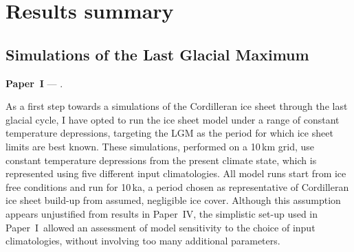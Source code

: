 \documentclass{article}
\newcommand{\todo}[1]{} %
\newcommand{\CCLI}[0]{Paper~I}      %
\newcommand{\CCYC}[0]{Paper~IV}     %
\begin{document}



\section{Results summary}

\subsection{Simulations of the Last Glacial Maximum}

\noindent\textbf{\CCLI} --- .
\bigskip

As a first step towards a simulations of the Cordilleran ice sheet through the
last glacial cycle, I have opted to run the ice sheet model under a range of
constant temperature depressions, targeting the LGM as the period for which ice
sheet limits are best known. These simulations,
performed on a 10\,km grid, use constant temperature depressions
from the present climate state, which is represented using five different input
climatologies. All model runs start
from ice free conditions and run for 10\,ka, a period chosen as representative
of Cordilleran ice sheet build-up from assumed, negligible ice cover. Although
this assumption appears unjustified from results in \CCYC, the simplistic
set-up used in \CCLI\ allowed an assessment of model sensitivity to the choice
of input climatologies, without involving too many additional parameters.
\end{document}
